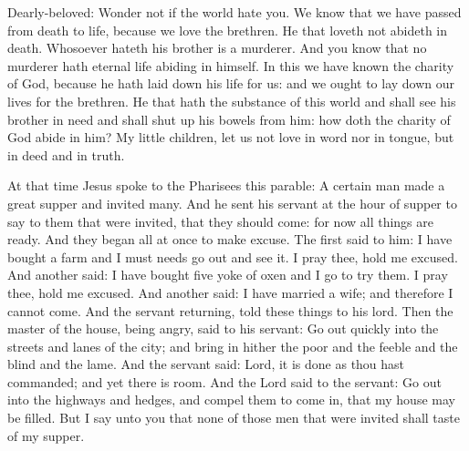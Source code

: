 Dearly-beloved: Wonder not if the world hate you.  We know that we have passed from
death to life, because we love the brethren. He that loveth not abideth in
death.  Whosoever hateth his brother is a murderer. And you know that no
murderer hath eternal life abiding in himself.  In this we have known the
charity of God, because he hath laid down his life for us: and we ought to lay
down our lives for the brethren.  He that hath the substance of this world and
shall see his brother in need and shall shut up his bowels from him: how doth
the charity of God abide in him?  My little children, let us not love in word
nor in tongue, but in deed and in truth.

\bigskip


At that time Jesus spoke to the Pharisees this parable:
A certain man made a great supper and invited many.  And he
sent his servant at the hour of supper to say to them that were invited, that
they should come: for now all things are ready.  And they began all at once to
make excuse. The first said to him: I have bought a farm and I must needs go
out and see it. I pray thee, hold me excused.  And another said: I have bought
five yoke of oxen and I go to try them. I pray thee, hold me excused.  And
another said: I have married a wife; and therefore I cannot come.  And the
servant returning, told these things to his lord.  Then the master of the
house, being angry, said to his servant: Go out quickly into the streets and
lanes of the city; and bring in hither the poor and the feeble and the blind
and the lame.  And the servant said: Lord, it is done as thou hast commanded;
and yet there is room.  And the Lord said to the servant: Go out into the
highways and hedges, and compel them to come in, that my house may be filled.
But I say unto you that none of those men that were invited shall taste of my
supper.


\bigskip



